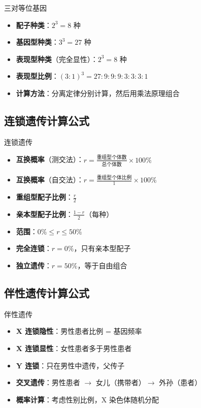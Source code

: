 \documentclass[a4paper,11pt]{ctexart}
\begin{document}
\begin{lemmabox}{三对等位基因}
\begin{itemize}[leftmargin=2em]
    \item \textbf{配子种类}：$2^3 = 8$ 种
    \item \textbf{基因型种类}：$3^3 = 27$ 种
    \item \textbf{表现型种类}（完全显性）：$2^3 = 8$ 种
    \item \textbf{表现型比例}：$(3:1)^3 = 27:9:9:9:3:3:3:1$
    \item \textbf{计算方法}：分离定律分别计算，然后用乘法原理组合
\end{itemize}
\end{lemmabox}

\subsection{连锁遗传计算公式}

\begin{lemmabox}{连锁遗传}
\begin{itemize}[leftmargin=2em]
    \item \textbf{互换概率}（测交法）：$r = \frac{\text{重组型个体数}}{\text{总个体数}} \times 100\%$
    \item \textbf{互换概率}（自交法）：$r = \frac{\text{重组型个体比例}}{1} \times 100\%$
    \item \textbf{重组型配子比例}：$\frac{r}{2}$
    \item \textbf{亲本型配子比例}：$\frac{1-r}{2}$（每种）
    \item \textbf{范围}：$0\% \leq r \leq 50\%$
    \item \textbf{完全连锁}：$r = 0\%$，只有亲本型配子
    \item \textbf{独立遗传}：$r = 50\%$，等于自由组合
\end{itemize}
\end{lemmabox}

\subsection{伴性遗传计算公式}

\begin{lemmabox}{伴性遗传}
\begin{itemize}[leftmargin=2em]
    \item \textbf{X 连锁隐性}：男性患者比例 = 基因频率
    \item \textbf{X 连锁显性}：女性患者多于男性患者
    \item \textbf{Y 连锁}：只在男性中遗传，父传子
    \item \textbf{交叉遗传}：男性患者 $\to$ 女儿（携带者）$\to$ 外孙（患者）
    \item \textbf{概率计算}：考虑性别比例，X 染色体随机分配
\end{itemize}
\end{lemmabox}
\end{document}
